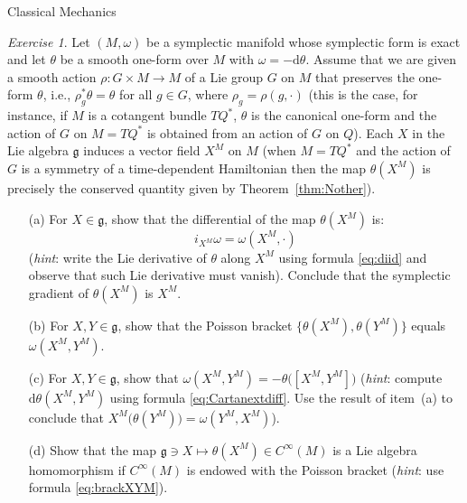 \documentclass[oneside,a4paper,11pt]{amsbook}
\newcommand{\dd}{\mathrm d}
\theoremstyle{remark}\newtheorem{exercise}{Exercise}[chapter]
\theoremstyle{plain}\newtheorem{teo}{Theorem}[section]
\theoremstyle{plain}\newtheorem{lem}[teo]{Lemma}
\theoremstyle{plain}\newtheorem{prop}[teo]{Proposition}
\theoremstyle{plain}\newtheorem{cor}[teo]{Corollary}
\theoremstyle{definition}\newtheorem{defin}[teo]{Definition}
\theoremstyle{remark}\newtheorem{rem}[teo]{Remark}
\theoremstyle{definition}\newtheorem{notation}[teo]{Notation}
\theoremstyle{definition}\newtheorem{convention}[teo]{Convention}
\theoremstyle{definition}\newtheorem{example}[teo]{Example}
\numberwithin{section}{chapter}
\numberwithin{equation}{section}
\begin{document}
\begin{chapter}{Classical Mechanics}
\begin{exercise}\label{exe:homoPoisson}
Let $(M,\omega)$ be a symplectic manifold whose symplectic form is exact and let $\theta$ be a smooth one-form over $M$ with $\omega=-\dd\theta$.
Assume that we are given a smooth action $\rho:G\times M\to M$ of a Lie group $G$ on $M$ that preserves the one-form $\theta$, i.e.,
$\rho_g^*\theta=\theta$ for all $g\in G$, where $\rho_g=\rho(g,\cdot)$ (this is the case, for instance, if $M$ is a cotangent bundle $TQ^*$,
$\theta$ is the canonical one-form and the action of $G$ on $M=TQ^*$ is obtained from an action of $G$ on $Q$). Each $X$ in the Lie algebra $\mathfrak g$
induces a vector field $X^{\!M}$ on $M$ (when $M=TQ^*$ and the action of $G$ is a symmetry of a time-dependent Hamiltonian then the map $\theta(X^{\!M})$ is
precisely the conserved quantity given by Theorem~\ref{thm:Nother}).
\begin{itemize}
\item[(a)] For $X\in\mathfrak g$, show that the differential of the map $\theta(X{\!^M})$ is:
\[i_{X^{\!M}}\omega=\omega(X^{\!M},\cdot)\]
({\em hint}: write the Lie derivative
of $\theta$ along $X^{\!M}$ using formula \eqref{eq:diid} and observe that such Lie derivative must vanish). Conclude that
the symplectic gradient of $\theta(X^{\!M})$ is $X^{\!M}$.
\item[(b)] For $X,Y\in\mathfrak g$, show that the Poisson bracket $\{\theta(X^{\!M}),\theta(Y^{\!M})\}$ equals $\omega(X^{\!M},Y^{\!M})$.
\item[(c)] For $X,Y\in\mathfrak g$, show that $\omega(X^{\!M},Y^{\!M})=-\theta\big([X^{\!M},Y^{\!M}]\big)$ ({\em hint}: compute $\dd\theta(X^{\!M},Y^{\!M})$ using
formula \eqref{eq:Cartanextdiff}. Use the result of item~(a) to conclude that $X^{\!M}\big(\theta(Y^{\!M})\big)=\omega(Y^{\!M},X^{\!M})$).
\item[(d)] Show that the map $\mathfrak g\ni X\longmapsto\theta(X^{\!M})\in C^\infty(M)$ is a Lie algebra homomorphism if $C^\infty(M)$ is endowed with
the Poisson bracket ({\em hint}: use formula \eqref{eq:brackXYM}).
\end{itemize}
\end{exercise}

\end{chapter}

\appendix
\end{document}
